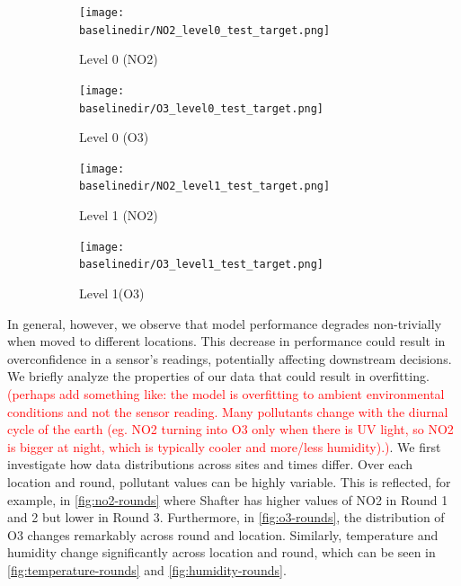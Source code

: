 \documentclass[journal abbreviation, manuscript]{copernicus}
\newcommand\todo[1]{\textcolor{red}{#1}}
\begin{document}
\begin{figure}[H]
\centering
\begin{subfigure}{0.45\textwidth}
\texttt{[image: \\baselinedir/NO2\_level0\_test\_target.png]}
\caption{Level 0 (NO2)}
\end{subfigure}
\begin{subfigure}{0.45\textwidth}
\texttt{[image: \\baselinedir/O3\_level0\_test\_target.png]}
\caption{Level 0 (O3)}
\end{subfigure}
\begin{subfigure}{0.45\textwidth}
\texttt{[image: \\baselinedir/NO2\_level1\_test\_target.png]}
\caption{Level 1 (NO2)}
\end{subfigure}
\begin{subfigure}{0.45\textwidth}
\texttt{[image: \\baselinedir/O3\_level1\_test\_target.png]}
\caption{Level 1(O3)}
\end{subfigure}
\caption{}
\label{fig:target-plots-levels}
\end{figure}


In general, however, we observe that model performance degrades non-trivially
when moved to different locations. This decrease in performance could result in overconfidence in a sensor's readings, potentially affecting downstream decisions. We briefly analyze the properties of our data that could result in overfitting.
\todo{(perhaps add something like: the model is overfitting to ambient environmental conditions and not the sensor reading. Many pollutants change with the diurnal cycle of the earth (eg. NO2 turning into O3 only when there is UV light, so NO2 is bigger at night, which is typically cooler and more/less humidity).)}.
We first investigate how data distributions across sites and times differ. Over each location and round, pollutant values can be highly variable. This is reflected, for example, in \autoref{fig:no2-rounds} where Shafter has higher values of NO2 in Round 1 and 2 but lower in Round 3. Furthermore, in \autoref{fig:o3-rounds}, the distribution of O3 changes remarkably across round and location.
Similarly, temperature and humidity change significantly across location and round, which can be seen in \autoref{fig:temperature-rounds} and \autoref{fig:humidity-rounds}.

\end{document}

